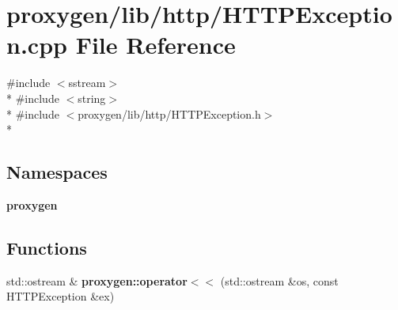 \section{proxygen/lib/http/\+H\+T\+T\+P\+Exception.cpp File Reference}
\label{HTTPException_8cpp}
{\ttfamily \#include $<$sstream$>$}\\*
{\ttfamily \#include $<$string$>$}\\*
{\ttfamily \#include $<$proxygen/lib/http/\+H\+T\+T\+P\+Exception.\+h$>$}\\*
\subsection*{Namespaces}
\begin{DoxyCompactItemize}
\item 
 {\bf proxygen}
\end{DoxyCompactItemize}
\subsection*{Functions}
\begin{DoxyCompactItemize}
\item 
std\+::ostream \& {\bf proxygen\+::operator$<$$<$} (std\+::ostream \&os, const H\+T\+T\+P\+Exception \&ex)
\end{DoxyCompactItemize}

